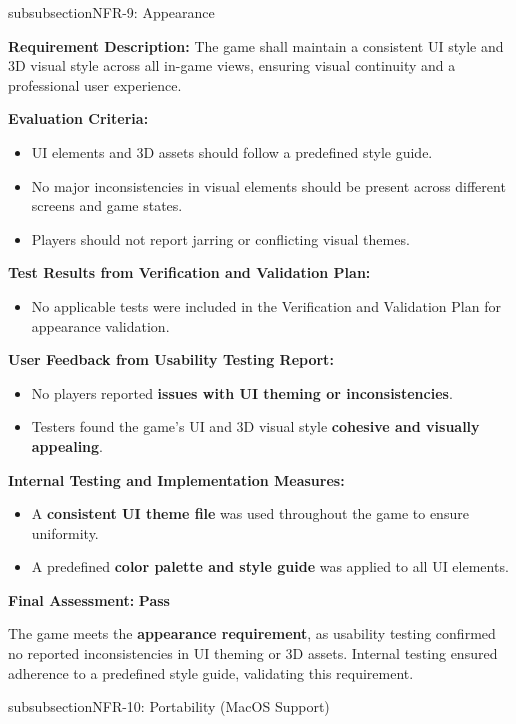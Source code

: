 \documentclass[12pt, titlepage]{article}
\begin{document}
\*subsubsection{NFR-9: Appearance}

\textbf{Requirement Description:}  
The game shall maintain a consistent UI style and 3D visual style across all in-game views, ensuring visual continuity and a professional user experience.

\textbf{Evaluation Criteria:}  
\begin{itemize}
    \item UI elements and 3D assets should follow a predefined style guide.
    \item No major inconsistencies in visual elements should be present across different screens and game states.
    \item Players should not report jarring or conflicting visual themes.
\end{itemize}

\textbf{Test Results from Verification and Validation Plan:}  
\begin{itemize}
    \item No applicable tests were included in the Verification and Validation Plan for appearance validation.
\end{itemize}

\textbf{User Feedback from Usability Testing Report:}  
\begin{itemize}
    \item No players reported \textbf{issues with UI theming or inconsistencies}.
    \item Testers found the game’s UI and 3D visual style \textbf{cohesive and visually appealing}.
\end{itemize}

\textbf{Internal Testing and Implementation Measures:}  
\begin{itemize}
    \item A \textbf{consistent UI theme file} was used throughout the game to ensure uniformity.
    \item A predefined \textbf{color palette and style guide} was applied to all UI elements.
\end{itemize}

\textbf{Final Assessment:} \textbf{Pass}  

The game meets the \textbf{appearance requirement}, as usability testing confirmed no reported inconsistencies in UI theming or 3D assets. Internal testing ensured adherence to a predefined style guide, validating this requirement.


\*subsubsection{NFR-10: Portability (MacOS Support)}
\end{document}
